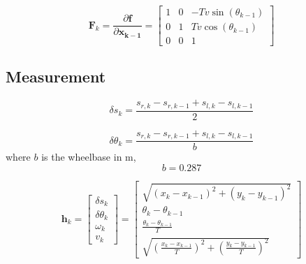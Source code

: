 \documentclass{ieeeaccess}
\begin{document}
	\begin{equation}
	\label{eq:Fsys}
		\boldsymbol{F}_{k} = \frac{\partial\boldsymbol{f}}{\partial\boldsymbol{x_{k-1}}}
		=
		\begin{bmatrix}
			1	&0	&-Tv\sin{\left(\theta_{k-1}\right)}	\\
			0	&1	&Tv\cos{\left(\theta_{k-1}\right)}	\\
			0	&0	&1
		\end{bmatrix}
	\end{equation}

\subsection{Measurement}

	\begin{equation}
	\label{eq:delts}
		\delta s_{k} = \frac{s_{r,k} - s_{r,k-1} + s_{l,k} - s_{l,k-1}}{2}
	\end{equation}
	
	\begin{equation}
	\label{eq:deltth}
		\delta \theta_{k} = \frac{s_{r,k} - s_{r,k-1} + s_{l,k} - s_{l,k-1}}{b}
	\end{equation}
	where $b$ is the wheelbase in m,
	\begin{equation}
	\label{eq:b}
		b = 0.287
	\end{equation}
	
	\begin{equation}
	\label{eq:hsys}
		\boldsymbol{h}_{ k} =
		\begin{bmatrix}
			\delta s_{k} 		\\
			\delta\theta_{k}	\\
			\omega_{k}		\\
			v_{k}
		\end{bmatrix}
		=
		\begin{bmatrix}
			\sqrt{\left(x_{k} - x_{k-1}\right)^{2} + \left(y_{k} - y_{k-1}\right)^{2}}	\\
			\theta_{k} - \theta_{k-1}								\\
			\frac{\theta_{k}-\theta_{k-1}}{T}						\\
			\sqrt{\left(\frac{x_{k} - x_{k-1}}{T}\right)^{2} + \left(\frac{y_{k} - y_{k-1}}{T}\right)^{2}}	
		\end{bmatrix}
	\end{equation}
	
\end{document}
